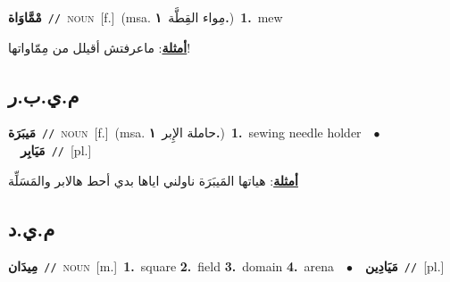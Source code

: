 \documentclass[10pt,a4paper,twoside]{article} %
\begin{document}
\begin{multicols}{2}
{\setlength\topsep{0pt}\textbf{\foreignlanguage{arabic}{مْمَّاوَاة}}\ {\color{gray}\texttt{//}\color{black}}\ \textsc{noun}\ [f.]\ \color{gray}(msa. \foreignlanguage{arabic}{مِواء القِطَّة}~\foreignlanguage{arabic}{\textbf{١.}})\color{black}\ \textbf{1.}~mew\  \begin{flushright}\color{gray}\foreignlanguage{arabic}{\textbf{\underline{\foreignlanguage{arabic}{أمثلة}}}: ماعرفتش أقيلل من مِمّاواتها!}\end{flushright}\color{black}} \vspace{2mm}

\vspace{-3mm}
\subsection*{\color{blue}\foreignlanguage{arabic}{م.ي.ب.ر}\color{blue}{}} 

{\setlength\topsep{0pt}\textbf{\foreignlanguage{arabic}{مَيبَرَة}}\ {\color{gray}\texttt{//}\color{black}}\ \textsc{noun}\ [f.]\ \color{gray}(msa. \foreignlanguage{arabic}{حاملة الإِبر}~\foreignlanguage{arabic}{\textbf{١.}})\color{black}\ \textbf{1.}~sewing needle holder\ \ $\bullet$\ \ \setlength\topsep{0pt}\textbf{\foreignlanguage{arabic}{مَيَابِر}}\ {\color{gray}\texttt{//}\color{black}}\ [pl.]\  \begin{flushright}\color{gray}\foreignlanguage{arabic}{\textbf{\underline{\foreignlanguage{arabic}{أمثلة}}}: هياتها المَيبَرَة ناولني اياها بدي أحط هالابر والمَسَلِّة}\end{flushright}\color{black}} \vspace{2mm}

\vspace{-3mm}
\subsection*{\color{blue}\foreignlanguage{arabic}{م.ي.د}\color{blue}{}} 

{\setlength\topsep{0pt}\textbf{\foreignlanguage{arabic}{مِيدَان}}\ {\color{gray}\texttt{//}\color{black}}\ \textsc{noun}\ [m.]\ \textbf{1.}~square  \textbf{2.}~field  \textbf{3.}~domain  \textbf{4.}~arena\ \ $\bullet$\ \ \setlength\topsep{0pt}\textbf{\foreignlanguage{arabic}{مَيَادِين}}\ {\color{gray}\texttt{//}\color{black}}\ [pl.]\ } \vspace{2mm}


\end{multicols}
\end{document}

